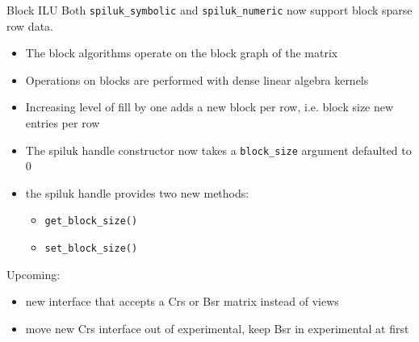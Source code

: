 \begin{frame}{Block ILU}
Both {\tt spiluk\_symbolic} and {\tt spiluk\_numeric} now support block sparse row data.
\begin{itemize}
\item The block algorithms operate on the block graph of the matrix
\item Operations on blocks are performed with dense linear algebra kernels
\item Increasing level of fill by one adds a new block per row, i.e. block size new entries per row
\item The spiluk handle constructor now takes a {\tt block\_size} argument defaulted to 0
\item the spiluk handle provides two new methods:
\begin{itemize}
\item {\tt get\_block\_size()}
\item {\tt set\_block\_size()}
\end{itemize}
\end{itemize}

Upcoming:
\begin{itemize}
\item new interface that accepts a Crs or Bsr matrix instead of views
\item move new Crs interface out of experimental, keep Bsr in experimental at first
\end{itemize}
\end{frame}




